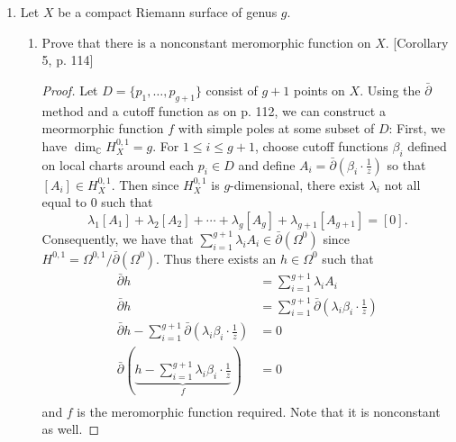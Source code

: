 \documentclass[11pt,oneside,english,reqno]{amsart}
\theoremstyle{definition}
\newcommand{\MB}[1]{\mathbb{#1}}
\begin{document}
\begin{enumerate}[leftmargin=*]
\begin{proof}
By Proposition 26 on p. 113 (a consequence of the $\bar \partial$ method), we are guaranteed the existence of a meromorphic function $f_1:\Sigma\to \MB{C}$ with a simple pole at $x_1$ and zeroes at $x_2,\ldots,x_n$. Let $g(z)=\frac{z}{z+1}$ and consider the composite function
\[
h_1(z)=gf_1(z)=\frac{f_1(z)}{f_1(z)+1}.
\]
This function has the value 1 at $x_1$ and 0 at $x_2,\ldots,x_n$. Invoking Proposition 26 on p. 113 repeatedly, we can produce $n$ meromorphic functions $f_i:\Sigma\to\MB{C}$ where $f_i$ has a simple pole at $x_i$ and zeroes at $x_j$ for $j\neq i$. Then define $h_i=gf_i$ and these functions will take the value 1 at $x_i$ and 0 at $x_j$ for $j\neq i$. Lastly, write
\[
\phi(z)=\sum_{i=1}^nw_ih_i(z),
\]
and we have a meromorphic function that maps $x_i$ to $w_i$ for all $i=1,\ldots,n$.
\end{proof}
\pagebreak


\item Let $X$ be a compact Riemann surface of genus $g$.
\begin{enumerate}
\item Prove that there is a nonconstant meromorphic function on $X$. [Corollary 5, p. 114]

\begin{proof}
Let $D=\{p_1,\ldots,p_{g+1}\}$ consist of $g+1$ points on $X$. Using the $\bar \partial$ method and a cutoff function as on p. 112, we can construct a meormorphic function $f$ with simple poles at some subset of $D$: First, we have $\dim_\MB{C}H^{0,1}_X=g$. For $1\leq i\leq g+1$, choose cutoff functions $\beta_i$ defined on local charts around each $p_i\in D$ and define $A_i=\bar\partial\left(\beta_i\cdot\frac{1}{z}\right)$ so that $[A_i]\in H^{0,1}_X$. Then since $H^{0,1}_X$ is $g$-dimensional, there exist $\lambda_i$ not all equal to 0 such that 
\[
\lambda_1[A_1]+\lambda_2[A_2]+\cdots+\lambda_g[A_g]+\lambda_{g+1}[A_{g+1}]=[0].
\]
Consequently, we have that $\sum_{i=1}^{g+1}\lambda_iA_i\in\bar\partial(\Omega^0)$ since $H^{0,1}=\Omega^{0,1}/\bar\partial(\Omega^0)$. Thus there exists an $h\in \Omega^0$ such that
\begin{align*}
\bar\partial h&=\sum_{i=1}^{g+1}\lambda_iA_i\\
\bar\partial h&=\sum_{i=1}^{g+1}\bar\partial\left(\lambda_i\beta_i\cdot\frac{1}{z}\right)\\
\bar\partial h-\sum_{i=1}^{g+1}\bar\partial\left(\lambda_i\beta_i\cdot\frac{1}{z}\right)&=0\\
\bar\partial \left(\underbrace{h-\sum_{i=1}^{g+1}\lambda_i\beta_i\cdot\frac{1}{z}}_{f}\right)&=0\\
\end{align*}
and $f$ is the meromorphic function required. Note that it is nonconstant as well.
\end{proof}




\end{enumerate}
\end{enumerate}
\end{document}
